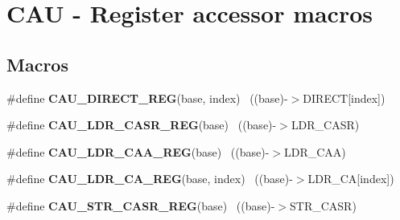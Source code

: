 \hypertarget{group___c_a_u___register___accessor___macros}{}\section{C\+A\+U -\/ Register accessor macros}
\label{group___c_a_u___register___accessor___macros}
\subsection*{Macros}
\begin{DoxyCompactItemize}
\item 
\hypertarget{group___c_a_u___register___accessor___macros_ga27d32855361b703db672685871c13167}{}\#define {\bfseries C\+A\+U\+\_\+\+D\+I\+R\+E\+C\+T\+\_\+\+R\+E\+G}(base,  index)                          ~((base)-\/$>$D\+I\+R\+E\+C\+T\mbox{[}index\mbox{]})\label{group___c_a_u___register___accessor___macros_ga27d32855361b703db672685871c13167}

\item 
\hypertarget{group___c_a_u___register___accessor___macros_ga38026a04061643ad3aef4e8922887ada}{}\#define {\bfseries C\+A\+U\+\_\+\+L\+D\+R\+\_\+\+C\+A\+S\+R\+\_\+\+R\+E\+G}(base)                                  ~((base)-\/$>$L\+D\+R\+\_\+\+C\+A\+S\+R)\label{group___c_a_u___register___accessor___macros_ga38026a04061643ad3aef4e8922887ada}

\item 
\hypertarget{group___c_a_u___register___accessor___macros_ga8da49b4422d66e9c173ce8579d50ebe5}{}\#define {\bfseries C\+A\+U\+\_\+\+L\+D\+R\+\_\+\+C\+A\+A\+\_\+\+R\+E\+G}(base)                                    ~((base)-\/$>$L\+D\+R\+\_\+\+C\+A\+A)\label{group___c_a_u___register___accessor___macros_ga8da49b4422d66e9c173ce8579d50ebe5}

\item 
\hypertarget{group___c_a_u___register___accessor___macros_ga87401902da32d62bd8212417dffcac7b}{}\#define {\bfseries C\+A\+U\+\_\+\+L\+D\+R\+\_\+\+C\+A\+\_\+\+R\+E\+G}(base,  index)                          ~((base)-\/$>$L\+D\+R\+\_\+\+C\+A\mbox{[}index\mbox{]})\label{group___c_a_u___register___accessor___macros_ga87401902da32d62bd8212417dffcac7b}

\item 
\hypertarget{group___c_a_u___register___accessor___macros_ga7e42415c09af57ba210a2d37c80b644c}{}\#define {\bfseries C\+A\+U\+\_\+\+S\+T\+R\+\_\+\+C\+A\+S\+R\+\_\+\+R\+E\+G}(base)                                  ~((base)-\/$>$S\+T\+R\+\_\+\+C\+A\+S\+R)\label{group___c_a_u___register___accessor___macros_ga7e42415c09af57ba210a2d37c80b644c}


\end{DoxyCompactItemize}
